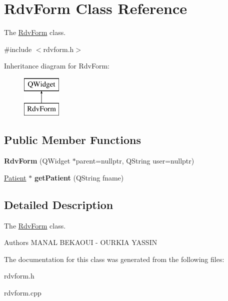 \hypertarget{class_rdv_form}{}\section{Rdv\+Form Class Reference}
\label{class_rdv_form}


The \mbox{\hyperlink{class_rdv_form}{Rdv\+Form}} class.  




{\ttfamily \#include $<$rdvform.\+h$>$}

Inheritance diagram for Rdv\+Form\+:\begin{figure}[H]
\begin{center}
\leavevmode
\includegraphics[height=2.000000cm]{class_rdv_form}
\end{center}
\end{figure}
\subsection*{Public Member Functions}
\begin{DoxyCompactItemize}
\item 
\mbox{\label{class_rdv_form_a26f5f247bfffe65ca85e2f2e8d769c8a}} 
{\bfseries Rdv\+Form} (Q\+Widget $\ast$parent=nullptr, Q\+String user=nullptr)
\item 
\mbox{\label{class_rdv_form_aee1f52f10a74e3c307e28d838408afda}} 
\mbox{\hyperlink{class_patient}{Patient}} $\ast$ {\bfseries get\+Patient} (Q\+String fname)
\end{DoxyCompactItemize}


\subsection{Detailed Description}
The \mbox{\hyperlink{class_rdv_form}{Rdv\+Form}} class. 

\begin{DoxyAuthor}{Authors}
M\+A\+N\+AL B\+E\+K\+A\+O\+UI -\/ O\+U\+R\+K\+IA Y\+A\+S\+S\+IN 
\end{DoxyAuthor}


The documentation for this class was generated from the following files\+:\begin{DoxyCompactItemize}
\item 
rdvform.\+h\item 
rdvform.\+cpp\end{DoxyCompactItemize}
